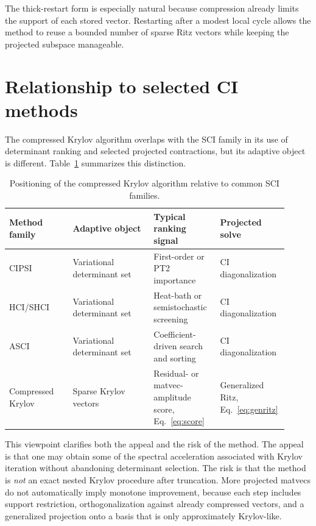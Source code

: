 \documentclass[aip,jcp,preprint,longbibliography]{revtex4-2}
\begin{document}
The thick-restart form is especially natural because compression already limits the support of each stored vector. Restarting after a modest local cycle allows the method to reuse a bounded number of sparse Ritz vectors while keeping the projected subspace manageable.

\section{Relationship to selected CI methods}
The compressed Krylov algorithm overlaps with the SCI family in its use of determinant ranking and selected projected contractions, but its adaptive object is different. Table~\ref{tab:positioning} summarizes this distinction.

\begin{table}[htbp]
\caption{Positioning of the compressed Krylov algorithm relative to common SCI families.}
\label{tab:positioning}
\begin{ruledtabular}
\begin{tabular}{p{0.22\linewidth} p{0.28\linewidth} p{0.23\linewidth} p{0.18\linewidth}}
Method family & Adaptive object & Typical ranking signal & Projected solve \\
\hline
CIPSI\cite{huron1973cipsi} & Variational determinant set & First-order or PT2 importance & CI diagonalization \\
HCI/SHCI\cite{holmes2016hci,sharma2017shci} & Variational determinant set & Heat-bath or semistochastic screening & CI diagonalization \\
ASCI\cite{tubman2016asci,tubman2020asci} & Variational determinant set & Coefficient-driven search and sorting & CI diagonalization \\
Compressed Krylov & Sparse Krylov vectors & Residual- or matvec-amplitude score, Eq.~\eqref{eq:score} & Generalized Ritz, Eq.~\eqref{eq:genritz}
\end{tabular}
\end{ruledtabular}
\end{table}

This viewpoint clarifies both the appeal and the risk of the method. The appeal is that one may obtain some of the spectral acceleration associated with Krylov iteration without abandoning determinant selection. The risk is that the method is \emph{not} an exact nested Krylov procedure after truncation. More projected matvecs do not automatically imply monotone improvement, because each step includes support restriction, orthogonalization against already compressed vectors, and a generalized projection onto a basis that is only approximately Krylov-like.
\end{document}
